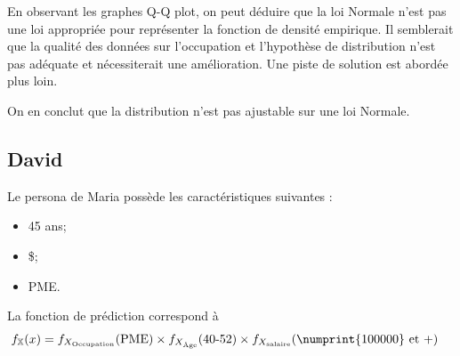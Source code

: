 \documentclass[11pt,french]{article}\usepackage[]{graphicx}\usepackage[]{color}
\begin{document}
En observant les graphes Q-Q plot, on peut déduire que la loi Normale n'est pas une loi appropriée pour représenter la fonction de densité empirique. Il semblerait que la qualité des données sur l'occupation et l'hypothèse de distribution n'est pas adéquate et nécessiterait une amélioration. Une piste de solution est abordée plus loin.

On en conclut que la distribution n'est pas ajustable sur une loi Normale.

\subsection*{David}
Le persona de Maria possède les caractéristiques suivantes : 
\begin{itemize}
\item 45 ans;
\item{} \$;
\item PME.
\end{itemize}
La fonction de prédiction correspond à
\begin{align*}
f_{\mathbb{X}}(x) &= f_{X_{\text{Occupation}}}(\text{PME}) \times f_{X_{\text{Âge}}}(\text{40-52}) \times f_{X_{\text{salaire}}}(\text{\numprint{100000} et +})
\end{align*}
\end{document}
